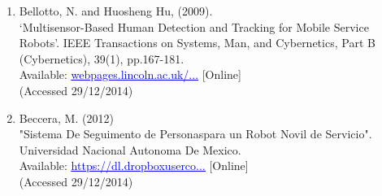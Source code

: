 \documentclass{article}
\begin{document}
\begin{enumerate}
\item Bellotto, N. and Huosheng Hu, (2009).
\\‘Multisensor-Based Human Detection and Tracking for Mobile Service Robots’. IEEE Transactions on Systems, Man, and Cybernetics, Part B (Cybernetics), 39(1), pp.167-181. \\ Available: \href{webpages.lincoln.ac.uk/nbellotto/doc/Bellotto2009.pdf}{\textcolor{blue}{\uline{webpages.lincoln.ac.uk/...}}} [Online]
\\(Accessed 29/12/2014)

\item Beccera, M. (2012)
\\"Sistema De Seguimento de Personaspara un Robot Novil de Servicio". Universidad Nacional Autonoma De Mexico.
\\Available: \href{https://dl.dropboxusercontent.com/u/53733773/web/files/Becerra12_MEngThesis.pdf}{\textcolor{blue}{\uline{https://dl.dropboxuserco...}}} [Online]
\\(Accessed 29/12/2014)

\end{enumerate}
\end{document}
